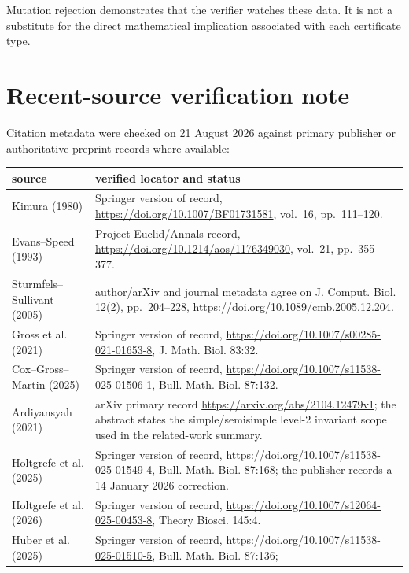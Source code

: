 \documentclass[11pt]{article}
\theoremstyle{remark}
\begin{document}
Mutation rejection demonstrates that the verifier watches these data.  It is
not a substitute for the direct mathematical implication associated with each
certificate type.

\section{Recent-source verification note}\label{sec:citations}

Citation metadata were checked on 21 August 2026 against primary publisher or
authoritative preprint records where available:
\begin{center}
\small
\begin{tabular}{L{.27\linewidth}L{.63\linewidth}}
\toprule
source & verified locator and status\\
\midrule
Kimura (1980) \cite{Kimura1980}
& Springer version of record, \url{https://doi.org/10.1007/BF01731581},
vol.~16, pp.~111--120.\\
Evans--Speed (1993) \cite{EvansSpeed1993}
& Project Euclid/Annals record,
\url{https://doi.org/10.1214/aos/1176349030}, vol.~21, pp.~355--377.\\
Sturmfels--Sullivant (2005) \cite{SturmfelsSullivant2005}
& author/arXiv and journal metadata agree on J. Comput. Biol. 12(2),
pp.~204--228, \url{https://doi.org/10.1089/cmb.2005.12.204}.\\
Gross et al. (2021) \cite{GrossEtAl2021}
& Springer version of record,
\url{https://doi.org/10.1007/s00285-021-01653-8}, J. Math. Biol. 83:32.\\
Cox--Gross--Martin (2025) \cite{CoxGrossMartin2025}
& Springer version of record,
\url{https://doi.org/10.1007/s11538-025-01506-1}, Bull. Math. Biol. 87:132.\\
Ardiyansyah (2021) \cite{Ardiyansyah2021}
& arXiv primary record \url{https://arxiv.org/abs/2104.12479v1}; the abstract
states the simple/semisimple level-2 invariant scope used in the related-work
summary.\\
Holtgrefe et al. (2025) \cite{HoltgrefeEtAl2025Quartets}
& Springer version of record,
\url{https://doi.org/10.1007/s11538-025-01549-4}, Bull. Math. Biol. 87:168;
the publisher records a 14 January 2026 correction.\\
Holtgrefe et al. (2026) \cite{HoltgrefeEtAl2026}
& Springer version of record,
\url{https://doi.org/10.1007/s12064-025-00453-8}, Theory Biosci. 145:4.\\
Huber et al. (2025) \cite{HuberEtAl2025}
& Springer version of record,
\url{https://doi.org/10.1007/s11538-025-01510-5}, Bull. Math. Biol. 87:136;

\end{tabular}
\end{center}
\end{document}

